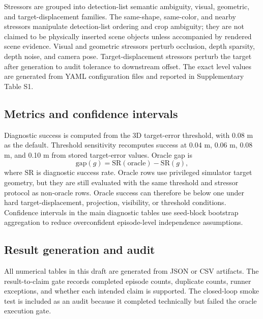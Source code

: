 Stressors are grouped into detection-list semantic ambiguity, visual, geometric, and target-displacement families. The same-shape, same-color, and nearby stressors manipulate detection-list ordering and crop ambiguity; they are not claimed to be physically inserted scene objects unless accompanied by rendered scene evidence. Visual and geometric stressors perturb occlusion, depth sparsity, depth noise, and camera pose. Target-displacement stressors perturb the target after generation to audit tolerance to downstream offset. The exact level values are generated from YAML configuration files and reported in Supplementary Table S1.

\subsection{Metrics and confidence intervals}

Diagnostic success is computed from the 3D target-error threshold, with 0.08 m as the default. Threshold sensitivity recomputes success at 0.04 m, 0.06 m, 0.08 m, and 0.10 m from stored target-error values. Oracle gap is
\[
\mathrm{gap}(g)=\mathrm{SR}(\mathrm{oracle})-\mathrm{SR}(g),
\]
where \(\mathrm{SR}\) is diagnostic success rate. Oracle rows use privileged simulator target geometry, but they are still evaluated with the same threshold and stressor protocol as non-oracle rows. Oracle success can therefore be below one under hard target-displacement, projection, visibility, or threshold conditions. Confidence intervals in the main diagnostic tables use seed-block bootstrap aggregation to reduce overconfident episode-level independence assumptions.

\subsection{Result generation and audit}

All numerical tables in this draft are generated from JSON or CSV artifacts. The result-to-claim gate records completed episode counts, duplicate counts, runner exceptions, and whether each intended claim is supported. The closed-loop smoke test is included as an audit because it completed technically but failed the oracle execution gate.

